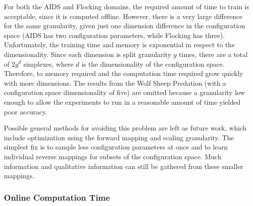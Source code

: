 For both the AIDS and Flocking domains, the required amount of time to train is acceptable, since it is computed offline.
However, there is a very large difference for the same granularity, given just one dimension difference in the configuration space (AIDS has two configuration parameters, while Flocking has three).
Unfortunately, the training time and memory is exponential in respect to the dimensionality.
Since each dimension is split granularity $g$ times, there are a total of $2 g^d$ simplexes, where $d$ is the dimensionality of the configuration space.
Therefore, to memory required and the computation time required grow quickly with more dimensions.
The results from the Wolf Sheep Predation (with a configuration space dimensionality of five) are omitted because a granularity low enough to allow the experiments to run in a reasonable amount of time yielded poor accuracy.

Possible general methods for avoiding this problem are left as future work, which include optimization using the forward mapping and scaling granularity.
The simplest fix is to sample less configuration parameters at once and to learn individual reverse mappings for subsets of the configuration space.
Much information and qualitative information can still be gathered from these smaller mappings.


  \subsubsection{Online Computation Time}

